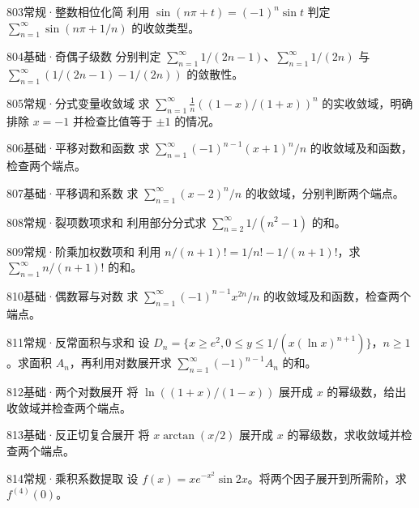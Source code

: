 \begin{exercise}{803}{常规·整数相位化简}
利用 $\sin(n\pi+t)=(-1)^n\sin t$ 判定 $\sum_{n=1}^{\infty}\sin(n\pi+1/n)$ 的收敛类型。
\end{exercise}
\begin{exercise}{804}{基础·奇偶子级数}
分别判定 $\sum_{n=1}^{\infty}1/(2n-1)$、$\sum_{n=1}^{\infty}1/(2n)$ 与 $\sum_{n=1}^{\infty}(1/(2n-1)-1/(2n))$ 的敛散性。
\end{exercise}
\begin{exercise}{805}{常规·分式变量收敛域}
求 $\sum_{n=1}^{\infty}\frac1n((1-x)/(1+x))^n$ 的实收敛域，明确排除 $x=-1$ 并检查比值等于 $\pm1$ 的情况。
\end{exercise}
\begin{exercise}{806}{基础·平移对数和函数}
求 $\sum_{n=1}^{\infty}(-1)^{n-1}(x+1)^n/n$ 的收敛域及和函数，检查两个端点。
\end{exercise}
\begin{exercise}{807}{基础·平移调和系数}
求 $\sum_{n=1}^{\infty}(x-2)^n/n$ 的收敛域，分别判断两个端点。
\end{exercise}
\begin{exercise}{808}{常规·裂项数项求和}
利用部分分式求 $\sum_{n=2}^{\infty}1/(n^2-1)$ 的和。
\end{exercise}
\begin{exercise}{809}{常规·阶乘加权数项和}
利用 $n/(n+1)!=1/n!-1/(n+1)!$，求 $\sum_{n=1}^{\infty}n/(n+1)!$ 的和。
\end{exercise}
\begin{exercise}{810}{基础·偶数幂与对数}
求 $\sum_{n=1}^{\infty}(-1)^{n-1}x^{2n}/n$ 的收敛域及和函数，检查两个端点。
\end{exercise}
\begin{exercise}{811}{常规·反常面积与求和}
设 $D_n=\{x\geq e^2,0\leq y\leq1/(x(\ln x)^{n+1})\}$，$n\geq1$。求面积 $A_n$，再利用对数展开求 $\sum_{n=1}^{\infty}(-1)^{n-1}A_n$ 的和。
\end{exercise}
\begin{exercise}{812}{基础·两个对数展开}
将 $\ln((1+x)/(1-x))$ 展开成 $x$ 的幂级数，给出收敛域并检查两个端点。
\end{exercise}
\begin{exercise}{813}{基础·反正切复合展开}
将 $x\arctan(x/2)$ 展开成 $x$ 的幂级数，求收敛域并检查两个端点。
\end{exercise}
\begin{exercise}{814}{常规·乘积系数提取}
设 $f(x)=xe^{-x^2}\sin2x$。将两个因子展开到所需阶，求 $f^{(4)}(0)$。
\end{exercise}
